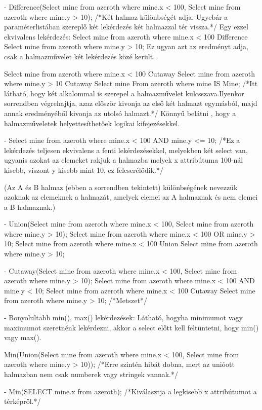 - Difference(Select mine from azeroth where mine.x < 100, Select mine from azeroth where mine.y > 10);  /*Két halmaz különbségét adja. Ugyebár a paraméterlistában szereplő két lekérdezés két halmazzal tér vissza.*/
Egy ezzel ekvivalens lekérdezés:
Select mine from azeroth where mine.x < 100 Difference Select mine from azeroth where mine.y > 10;   Ez ugyan azt az eredményt adja, csak a halmazművelet két lekérdezés közé került.

Select mine from azeroth where mine.x < 100 Cutaway Select mine from azeroth where mine.y > 10 Cutaway Select mine From azeroth where mine IS Mine;
/*Itt látható, hogy két alkalommal is szerepel a halmazművelet kulcsszava.Ilyenkor sorrendben végrehajtja, azaz először kivonja az első két halmazt egymásból, majd annak eredményéből kivonja az utolsó halmazt.*/
Könnyű belátni , hogy a halmazműveletek helyettesíthetőek logikai kifejezésekkel.

- Select mine from azeroth where mine.x < 100 AND mine.y <= 10;  /*Ez a lekérdezés teljesen ekvivalens a fenti lekérdezésekkel, melyekben két select van, ugyanis azokat az elemeket rakjuk a halmazba melyek x attribútuma 100-nál kisebb, viszont y kisebb mint 10, ez felcserélődik.*/

(Az A és B halmaz (ebben a sorrendben tekintett) különbségének nevezzük azoknak az elemeknek a halmazát, amelyek elemei az A halmaznak és nem elemei a B halmaznak.)

- Union(Select mine from azeroth where mine.x < 100, Select mine from azeroth where mine.y > 10);
Select mine from azeroth where mine.x < 100 OR mine.y > 10;
Select mine from azeroth where mine.x < 100 Union Select mine from azeroth where mine.y > 10;

- Cutaway(Select mine from azeroth where mine.x < 100, Select mine from azeroth where mine.y > 10);
Select mine from azeroth where mine.x < 100 AND mine.y < 10;
Select mine from azeroth where mine.x < 100 Cutaway Select mine from azeroth where mine.y > 10;
/*Metszet*/

- Bonyolultabb min(), max() lekérdezések: Látható, hogyha minimumot vagy maximumot szeretnénk lekérdezni, akkor a select előtt kell feltüntetni, hogy min() vagy max().

Min(Union(Select mine from azeroth where mine.x < 100, Select mine from azeroth where mine.y > 10)); /*Erre szintén hibát dobna, mert az unióott halmazban nem csak numberek vagy stringek vannak.*/

- Min(SELECT mine.x from azeroth);  /*Kiválasztja a legkisebb x attribútumot a térképről.*/

